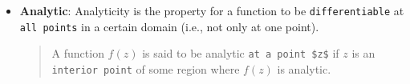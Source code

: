 \begin{itemize}
\item \textbf{Analytic}: Analyticity is the property for a function to be \verb|differentiable| at \verb|all points| in a certain domain (i.e., not only at one point).
\begin{quote}
A function $f(z)$ is said to be analytic \verb|at a point $z$| if $z$ is an \verb|interior point| of some region where $f(z)$ is analytic.
\end{quote}
\end{itemize}